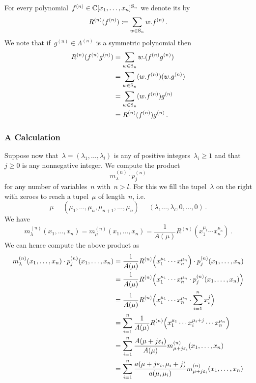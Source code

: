 \documentclass[a4paper, 11pt, twoside=semi]{scrartcl}
\begin{document}
For every polynomial~$f^{(n)} \in \mathbb{C}[x_1, \dotsc, x_n]^{\mathrm{S}_n}$ we denote its  by
\[
  R^{(n)}( f^{(n)} )
  \coloneqq
  \sum_{w \in \mathrm{S}_n}
  w . f^{(n)} \,.
\]
We note that if~$g^{(n)} \in \Lambda^{(n)}$ is a symmetric polynomial then
\begin{align*}
  R^{(n)}( f^{(n)} g^{(n)} )
  &=
  \sum_{w \in \mathrm{S}_n}
  w . ( f^{(n)} g^{(n)} )
  \\
  &=
  \sum_{w \in \mathrm{S}_n}
  (w . f^{(n)}) (w . g^{(n)})
  \\
  &=
  \sum_{w \in \mathrm{S}_n}
  (w . f^{(n)}) g^{(n)}
  \\
  &=
  R^{(n)}( f^{(n)} ) g^{(n)} \,.
\end{align*}


\subsubsection{A Calculation}

Suppose now that~$\lambda = (\lambda_1, \dotsc, \lambda_l)$ is any of positive integers~$\lambda_i \geq 1$ and that~$j \geq 0$ is any nonnegative integer.
We compute the product
\[
  m^{(n)}_\lambda
  \cdot
  p^{(n)}_j
\]
for any number of variables~$n$ with~$n > l$.
For this we fill the tupel~$\lambda$ on the right with zeroes to reach a tupel~$\mu$ of length~$n$, i.e.
\[
  \mu
  =
  (\mu_1, \dotsc, \mu_n, \mu_{n+1}, \dotsc, \mu_n)
  =
  (\lambda_1 \dotsc, \lambda_l, 0, \dotsc, 0) \,.
\]
We have
\[
  m^{(n)}_\lambda(x_1, \dotsc, x_n)
  =
  m^{(n)}_\mu(x_1, \dotsc, x_n)
  =
  \frac{1}{A(\mu)}
  R^{(n)}( x_1^{\mu_1} \dotsm x_n^{\mu_n} ) \,.
\]
We can hence compute the above product as
\begin{align*}
  m^{(n)}_\lambda(x_1, \dotsc, x_n) \cdot p^{(n)}_j(x_1, \dotsc, x_n)
  &=
  \frac{1}{A(\mu)}
  R^{(n)}\Bigl( x_1^{\mu_1} \dotsm x_n^{\mu_n} \Bigr)
  \cdot
  p^{(n)}_j(x_1, \dotsc, x_n)
  \\
  &=
  \frac{1}{A(\mu)}
  R^{(n)}
  \Bigl(
    x_1^{\mu_1} \dotsm x_n^{\mu_n}
    \cdot
    p^{(n)}_j(x_1, \dotsc, x_n)
  \Bigr)
  \\
  &=
  \frac{1}{A(\mu)}
  R^{(n)}
  \Bigl(
    x_1^{\mu_1} \dotsm x_n^{\mu_n}
    \cdot
    \sum_{i=1}^n x_i^j
  \Bigr)
  \\
  &=
  \sum_{i=1}^n
  \frac{1}{A(\mu)}
  R^{(n)}
  \Bigl(
    x_1^{\mu_1} \dotsm x_i^{\mu_i + j} \dotsm x_n^{\mu_n}
  \Bigr)
  \\
  &=
  \sum_{i=1}^n
  \frac{ A(\mu + j \varepsilon_i) }{ A(\mu) }
  m^{(n)}_{\mu + j \varepsilon_i}(x_1, \dotsc, x_n)
  \\
  &=
  \sum_{i=1}^n
  \frac{ a(\mu + j \varepsilon_i, \mu_i + j) }{ a(\mu, \mu_i) } 
  m^{(n)}_{\mu + j \varepsilon_i}(x_1, \dotsc, x_n)
\end{align*}
\end{document}

